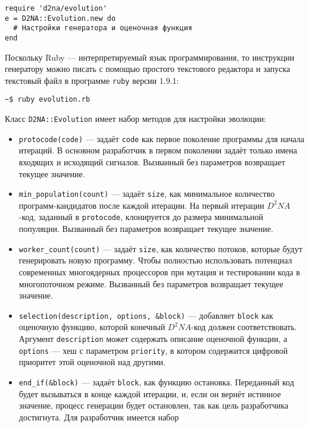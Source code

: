 \documentclass[utf8,a5paper,portrait,10pt,twoside]{eskdtext}
\begin{document}
\begin{verbatim}
require 'd2na/evolution'
e = D2NA::Evolution.new do
  # Настройки генератора и оценочная функция
end
\end{verbatim}

Поскольку Ruby — интерпретируемый язык программирования, то инструкции
генератору можно писать с помощью простого текстового редактора и запуска
текстовый файл в программе \texttt{ruby} версии 1.9.1:

\begin{verbatim}
~$ ruby evolution.rb
\end{verbatim}

Класс \texttt{D2NA::Evolution} имеет набор методов для настройки эволюции:
\begin{itemize}
  \item \texttt{protocode(code)} — задаёт \texttt{code} как первое поколение
        программы для начала итераций. В основном разработчик в первом поколении
        задаёт только имена входящих и исходящий сигналов.
        Вызванный без параметров возвращает текущее значение.
  \item \texttt{min\_population(count)} — задаёт \texttt{size}, как минимальное
        количество программ-кандидатов после каждой итерации. На первый итерации
        $D^2NA$-код, заданный в \texttt{protocode}, клонируется до размера
        минимальной популяции.
        Вызванный без параметров возвращает текущее значение.
  \item \texttt{worker\_count(count)} — задаёт \texttt{size}, как количество
        потоков, которые будут генерировать новую программу. Чтобы полностью
        использовать потенциал современных многоядерных процессоров при
        мутация и тестировании кода в многопоточном режиме.
        Вызванный без параметров возвращает текущее значение.
  \item \texttt{selection(description, options, \&block)} — добавляет
        \texttt{block} как оценочную функцию, которой конечный $D^2NA$-код
        должен соответствовать. Аргумент \texttt{description} может содержать
        описание оценочной функции, а \texttt{options} — хеш с параметром
        \texttt{priority}, в котором содержится цифровой приоритет этой
        оценочной над другими.
  \item \texttt{end\_if(\&block)} — задаёт \texttt{block}, как функцию
        остановка. Переданный код будет вызываться в конце каждой итерации, и,
        если он вернёт истинное значение, процесс генерации будет остановлен,
        так как цель разработчика достигнута. Для разработчик имеется набор

\end{itemize}
\end{document}
